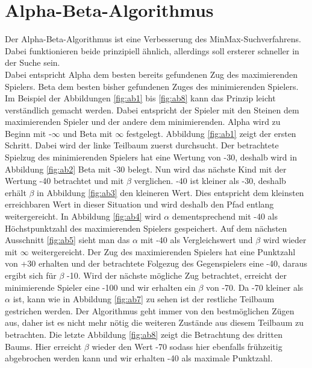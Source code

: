 \section{Alpha-Beta-Algorithmus}
\label{ch:Entwurf:sec:1.AB-Algo}
Der Alpha-Beta-Algorithmus ist eine Verbesserung des MinMax-Suchverfahrens. Dabei funktionieren beide prinzipiell ähnlich, allerdings soll ersterer schneller in der Suche sein.\\
Dabei entspricht Alpha dem besten bereits gefundenen Zug des maximierenden Spielers. Beta dem besten bisher gefundenen Zuges des minimierenden Spielers. Im Beispiel der Abbildungen \ref{fig:ab1} bis \ref{fig:ab8} kann das Prinzip leicht verständlich gemacht werden. Dabei entspricht der Spieler mit den Steinen dem maximierenden Spieler und der andere dem minimierenden. Alpha wird zu Beginn mit -$\infty$ und Beta mit $\infty$  festgelegt. Abbildung \ref{fig:ab1} zeigt der ersten Schritt. Dabei wird der linke Teilbaum zuerst durchsucht. Der betrachtete Spielzug des minimierenden Spielers hat eine Wertung von -30, deshalb wird in Abbildung \ref{fig:ab2} Beta mit -30 belegt. Nun wird das nächste Kind mit der Wertung -40 betrachtet und mit $\beta$ verglichen. -40 ist kleiner als -30, deshalb erhält $\beta$ in Abbildung \ref{fig:ab3} den kleineren Wert. Dies entspricht dem kleinsten erreichbaren Wert in dieser Situation und wird deshalb den Pfad entlang weitergereicht. In Abbildung \ref{fig:ab4} wird $\alpha$ dementsprechend mit -40 als Höchstpunktzahl des maximierenden Spielers gespeichert. Auf dem nächsten Ausschnitt \ref{fig:ab5} sieht man das $\alpha$ mit -40 als Vergleichswert und $\beta$ wird wieder mit $\infty$ weitergereicht. Der Zug des maximierenden Spielers hat eine Punktzahl von +30 erhalten und der betrachtete Folgezug des Gegenspielers eine -40, daraus ergibt sich für $\beta$ -10. Wird der nächste mögliche Zug betrachtet, erreicht der minimierende Spieler eine -100 und wir erhalten ein $\beta$ von -70. Da -70 kleiner als $\alpha$ ist, kann wie in Abbildung \ref{fig:ab7} zu sehen ist der restliche Teilbaum gestrichen werden. Der Algorithmus geht immer von den bestmöglichen Zügen aus, daher ist es nicht mehr nötig die weiteren Zustände aus diesem Teilbaum zu betrachten. Die letzte Abbildung \ref{fig:ab8} zeigt die Betrachtung des dritten Baums. Hier erreicht $\beta$ wieder den Wert -70 sodass hier ebenfalls frühzeitig abgebrochen werden kann und wir erhalten -40 als maximale Punktzahl.



